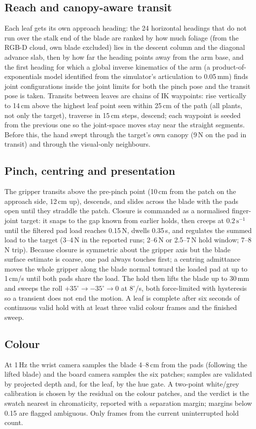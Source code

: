\documentclass[letterpaper, 10 pt, conference]{ieeeconf}
\begin{document}
\subsection{Reach and canopy-aware transit}
Each leaf gets its own approach heading: the 24 horizontal headings that do not run over the
stalk end of the blade are ranked by how much foliage (from the RGB-D cloud, own blade
excluded) lies in the descent column and the diagonal advance slab, then by how far the
heading points away from the arm base, and the first heading for which a global inverse
kinematics of the arm (a product-of-exponentials model identified from the simulator's
articulation to 0.05\,mm) finds joint configurations inside the joint limits for both the
pinch pose and the transit pose is taken. Transits between leaves are chains of IK
waypoints: rise vertically to 14\,cm above the highest leaf point seen within 25\,cm of the
path (all plants, not only the target), traverse in 15\,cm steps, descend; each waypoint is
seeded from the previous one so the joint-space moves stay near the straight segments.
Before this, the hand swept through the target's own canopy (9\,N on the pad in transit)
and through the visual-only neighbours.

\subsection{Pinch, centring and presentation}
The gripper transits above the pre-pinch point (10\,cm from the patch on the approach side,
12\,cm up), descends, and slides across the blade with the pads open until they straddle
the patch. Closure is commanded as a normalised finger-joint target: it snaps to the gap
known from earlier holds, then creeps at $0.2\,\mathrm{s^{-1}}$ until the filtered pad load
reaches 0.15\,N, dwells 0.35\,s, and regulates the summed load to the target
(3--4\,N in the reported runs; 2--6\,N or 2.5--7\,N hold window; 7--8\,N trip). Because
closure is symmetric about the gripper axis but the blade surface estimate is coarse, one
pad always touches first; a centring admittance moves the whole gripper along the blade
normal toward the loaded pad at up to 1\,cm/s until both pads share the load. The hold then
lifts the blade up to 30\,mm and sweeps the roll $+35^\circ\to-35^\circ\to0$ at $8^\circ$/s,
both force-limited with hysteresis so a transient does not end the motion. A leaf is
complete after six seconds of continuous valid hold with at least three valid colour frames
and the finished sweep.

\subsection{Colour}
At 1\,Hz the wrist camera samples the blade 4--8\,cm from the pads (following the lifted
blade) and the board camera samples the six patches; samples are validated by projected
depth and, for the leaf, by the hue gate. A two-point white/grey calibration is chosen by
the residual on the colour patches, and the verdict is the swatch nearest in chromaticity,
reported with a separation margin; margins below 0.15 are flagged ambiguous. Only frames
from the current uninterrupted hold count.
\end{document}
